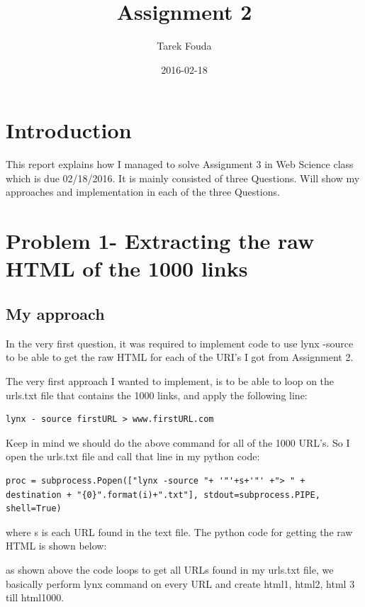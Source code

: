 \documentclass{article}
\title{Assignment 2}
\date{2016-02-18}
\author{Tarek Fouda}
\begin{document}
  \maketitle
\section{Introduction}
This report explains how I managed to solve Assignment 3 in Web Science class which is due 02/18/2016. It is mainly consisted of three Questions. Will show my approaches and implementation in each of the three Questions.

\section{Problem 1- Extracting the raw HTML of the 1000 links}

\subsection{My approach}

In the very first question, it was required to implement code to use lynx -source to be able to get the raw HTML for each of the URI's I got from Assignment 2.

The very first approach I wanted to implement, is to be able to loop on the urls.txt file that contains the 1000 links, and apply the following line:
\begin{lstlisting}
lynx - source firstURL > www.firstURL.com
\end{lstlisting} 

Keep in mind we should do the above command for all of the 1000 URL's. So I open the urls.txt file and call that line in my python code:

\begin{lstlisting}
proc = subprocess.Popen(["lynx -source "+ '"'+s+'"' +"> " + destination + "{0}".format(i)+".txt"], stdout=subprocess.PIPE, shell=True)
\end{lstlisting} 
where s is each URL found in the text file.
The python code for getting the raw HTML is shown below:


as shown above the code loops to get all URLs found in my urls.txt file, we basically perform lynx command on every URL and create html1, html2, html 3 till html1000.
\end{document}
